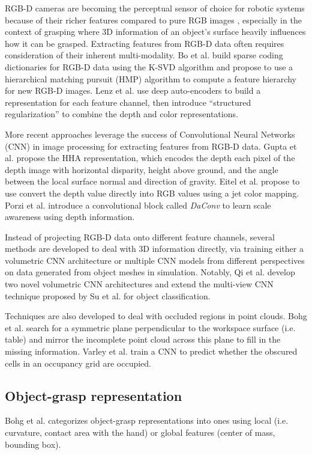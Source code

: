 \documentclass[runningheads]{../llncs}
\begin{document}
RGB-D cameras are becoming the perceptual sensor of choice for robotic systems because of their richer features
compared to pure RGB images \cite{lenz2015,Eitel2015,Gupta2014RGBDFeatures,jiang2011}, especially in the context of
grasping where 3D information of an object's surface heavily influences how it can be grasped. Extracting features from
RGB-D data often requires consideration of their inherent multi-modality. Bo et al. \cite{Bo2013} build sparse coding
dictionaries for RGB-D data using the K-SVD algorithm and propose to use a hierarchical matching pursuit (HMP)
algorithm to compute a feature hierarchy for new RGB-D images. Lenz et al. \cite{lenz2015} use deep auto-encoders to
build a representation for each feature channel, then introduce ``structured regularization'' to combine the depth and
color representations.

More recent approaches leverage the success of Convolutional Neural Networks (CNN) in image processing for extracting
features from RGB-D data. Gupta et al. \cite{Gupta2014RGBDFeatures} propose the HHA representation, which encodes the
depth each pixel of the depth image with horizontal disparity, height above ground, and the angle between the local
surface normal and direction of gravity. Eitel et al. \cite{Eitel2015} propose to use convert the depth value directly
into RGB values using a jet color mapping. Porzi et al. \cite{Porzi2017} introduce a convolutional block called
\emph{DaConv} to learn scale awareness using depth information.

Instead of projecting RGB-D data onto different feature channels, several methods are developed to deal with 3D
information directly, via training either a volumetric CNN architecture or multiple CNN models from different
perspectives on data generated from object meshes in simulation. Notably, Qi et al. \cite{Qi2016} develop two novel
volumetric CNN architectures and extend the multi-view CNN technique proposed by Su et al. \cite{Su2015} for object
classification.

Techniques are also developed to deal with occluded regions in point clouds. Bohg et al. \cite{Bohg2011MindTheGap}
search for a symmetric plane perpendicular to the workspace surface (i.e. table) and mirror the incomplete point cloud
across this plane to fill in the missing information. Varley et al. \cite{Varley2017} train a CNN to predict whether
the obscured cells in an occupancy grid are occupied.

\subsection{Object-grasp representation}
Bohg et al. categorizes object-grasp representations into ones using local (i.e. curvature, contact area with the hand)
or global features (center of mass, bounding box).
\end{document}
